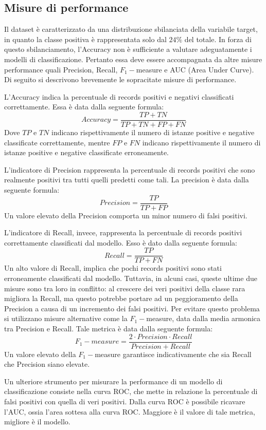 \documentclass[fleqn,10pt]{SelfArx}
\begin{document}
\subsection{Misure di performance}
Il dataset è caratterizzato da una distribuzione sbilanciata della variabile target, in quanto la classe positiva è rappresentata solo dal $24\%$ del totale. In forza di questo sbilanciamento, l'Accuracy non è sufficiente a valutare adeguatamente i modelli di classificazione.
Pertanto essa deve essere accompagnata da altre misure performance quali Precision, Recall, $F_1-$measure e AUC (Area Under Curve).
Di seguito si descrivono brevemente le sopracitate misure di performance.

L'Accuracy indica la percentuale di records positivi e negativi classificati correttamente. Essa è data dalla seguente formula:
$$
Accuracy = \frac{TP+TN}{TP+TN+FP+FN}
$$
Dove $TP$ e $TN$ indicano rispettivamente il numero di istanze positive e negative classificate correttamente, mentre $FP$ e $FN$ indicano rispettivamente il numero di istanze positive e negative classificate erroneamente.

L'indicatore di Precision rappresenta la percentuale di records positivi che sono realmente positivi tra tutti quelli predetti come tali. La precision è data dalla seguente formula:
$$
Precision = \frac{TP}{TP+FP}
$$
Un valore elevato della Precision comporta un minor numero di falsi positivi.

L'indicatore di Recall, invece, rappresenta la percentuale di records positivi correttamente classificati dal modello. Esso è dato dalla seguente formula:
$$
Recall = \frac{TP}{TP+FN}
$$
Un alto valore di Recall, implica che pochi records positivi sono stati erroneamente classificati dal modello. Tuttavia, in alcuni casi, queste ultime due misure sono tra loro in conflitto: al crescere dei veri positivi della classe rara migliora la Recall, ma questo potrebbe portare ad un peggioramento della Precision a causa di un incremento dei falsi positivi. Per evitare questo problema si utilizzano misure alternative come la $F_1-$measure, data dalla media armonica tra Precision e Recall. Tale metrica è data dalla seguente formula: 
$$
F_1-measure = \frac{2\cdot Precision \cdot Recall}{Precision + Recall}
$$
Un valore elevato della $F_1-$measure garantisce indicativamente che sia Recall che Precision siano elevate.

Un ulteriore strumento per misurare la performance di un modello di classificazione consiste nella curva ROC, che mette in relazione la percentuale di falsi positivi con quella di veri positivi. Dalla curva ROC è possibile ricavare l'AUC, ossia l'area sottesa alla curva ROC. Maggiore è il valore di tale metrica, migliore è il modello.
\end{document}
